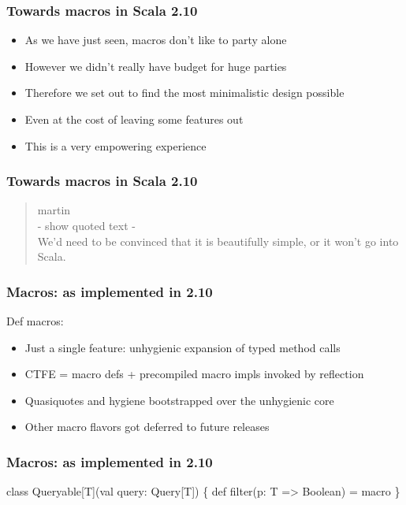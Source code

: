 \documentclass[svgnames,hyperref={bookmarks=false}]{beamer}
\begin{document}
\begin{frame}[fragile]
\frametitle{Towards macros in Scala 2.10}

\begin{itemize}
\item As we have just seen, macros don't like to party alone
\item However we didn't really have budget for huge parties
\item Therefore we set out to find the most minimalistic design possible
\item Even at the cost of leaving some features out
\item This is a very empowering experience
\end{itemize}
\end{frame}

\begin{frame}[fragile]
\frametitle{Towards macros in Scala 2.10}

\begin{quote}
martin\\
- show quoted text -\\
We'd need to be convinced that it is beautifully simple, or it won't go into Scala.
\end{quote}
\end{frame}

\begin{frame}[fragile]
\frametitle{Macros: as implemented in 2.10}

Def macros:
\begin{itemize}
\item Just a single feature: unhygienic expansion of typed method calls
\item CTFE = macro defs + precompiled macro impls invoked by reflection
\item Quasiquotes and hygiene bootstrapped over the unhygienic core
\item Other macro flavors got deferred to future releases
\end{itemize}
\end{frame}

\begin{frame}[fragile, t]
\frametitle{Macros: as implemented in 2.10}

\begin{semiverbatim}


class Queryable[T](val query: Query[T]) \{
  def filter(p: T => Boolean) = macro 
\}


\end{semiverbatim}
\end{frame}
\end{document}
